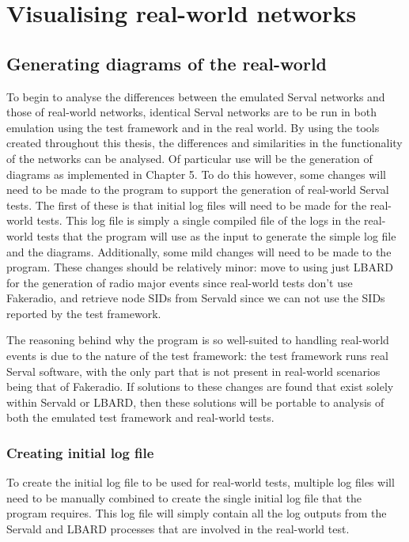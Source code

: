 
\chapter{Visualising real-world networks} %

\label{Chapter6} %


\section{Generating diagrams of the real-world}   
To begin to analyse the differences between the emulated Serval networks and those of real-world networks, identical Serval networks are to be run in both emulation using the test framework and in the real world.
By using the tools created throughout this thesis, the differences and similarities in the functionality of the networks can be analysed.
Of particular use will be the generation of diagrams as implemented in Chapter 5.
To do this however, some changes will need to be made to the program to support the generation of real-world Serval tests.
The first of these is that initial log files will need to be made for the real-world tests.
This log file is simply a single compiled file of the logs in the real-world tests that the program will use as the input to generate the simple log file and the diagrams.
Additionally, some mild changes will need to be made to the program. 
These changes should be relatively minor: move to using just LBARD for the generation of radio major events since real-world tests don't use Fakeradio, and retrieve node SIDs from Servald since we can not use the SIDs reported by the test framework.

The reasoning behind why the program is so well-suited to handling real-world events is due to the nature of the test framework: the test framework runs real Serval software, with the only part that is not present in real-world scenarios being that of Fakeradio.
If solutions to these changes are found that exist solely within Servald or LBARD, then these solutions will be portable to analysis of both the emulated test framework and real-world tests.

\subsection{Creating initial log file}
To create the initial log file to be used for real-world tests, multiple log files will need to be manually combined to create the single initial log file that the program requires.
This log file will simply contain all the log outputs from the Servald and LBARD processes that are involved in the real-world test.

